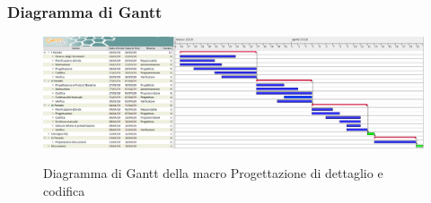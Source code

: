             \subsubsection{Diagramma di Gantt}

				\begin{figure}[H]
					\centering
					\includegraphics{img/Progettazione_di_dettaglio_e_codifica.png}\\
					\caption{Diagramma di Gantt della macro Progettazione di dettaglio e codifica}
				\end{figure}

